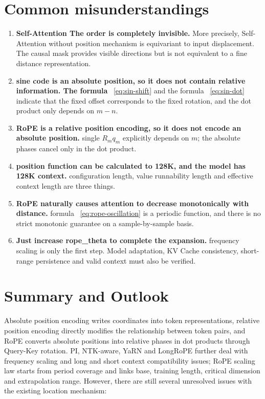 \documentclass[UTF8,fontset=none,a4paper,10pt]{ctexart}
\begin{document}
\section{Common misunderstandings}

\begin{enumerate}
\item \textbf{Self-Attention The order is completely invisible. } More precisely, Self-Attention without position mechanism is equivariant to input displacement. The causal mask provides visible directions but is not equivalent to a fine distance representation.
\item \textbf{ sine code is an absolute position, so it does not contain relative information. The formula } ~\eqref{eq:sin-shift} and the formula ~\eqref{eq:sin-dot} indicate that the fixed offset corresponds to the fixed rotation, and the dot product only depends on $m-n$.
\item \textbf{RoPE is a relative position encoding, so it does not encode an absolute position. } single $R_mq_m$ explicitly depends on $m$; the absolute phases cancel only in the dot product.
\item \textbf{ position function can be calculated to 128K, and the model has 128K context. } configuration length, value runnability length and effective context length are three things.
\item \textbf{RoPE naturally causes attention to decrease monotonically with distance. } formula ~\eqref{eq:rope-oscillation} is a periodic function, and there is no strict monotonic guarantee on a sample-by-sample basis.
\item \textbf{ Just increase \textnormal{rope\_theta} to complete the expansion. } frequency scaling is only the first step. Model adaptation, KV Cache consistency, short-range persistence and valid context must also be verified.
\end{enumerate}

\section{Summary and Outlook}

Absolute position encoding writes coordinates into token representations, relative position encoding directly modifies the relationship between token pairs, and RoPE converts absolute positions into relative phases in dot products through Query-Key rotation. PI, NTK-aware, YaRN and LongRoPE further deal with frequency scaling and long and short context compatibility issues; RoPE scaling law starts from period coverage and links base, training length, critical dimension and extrapolation range. However, there are still several unresolved issues with the existing location mechanism:
\end{document}
